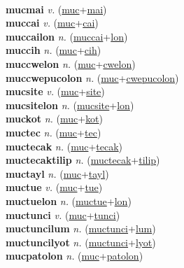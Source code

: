  \label{muclonolon} \\
\textbf{mucmai} \textit{v.} (\hyperref[muc]{muc}+\hyperref[mai]{mai})
 \label{mucmai} \\
\textbf{muccai} \textit{v.} (\hyperref[muc]{muc}+\hyperref[cai]{cai})
 \label{muccai} \\
\textbf{muccailon} \textit{n.} (\hyperref[muccai]{muccai}+\hyperref[lon]{lon})
 \label{muccailon} \\
\textbf{muccih} \textit{n.} (\hyperref[muc]{muc}+\hyperref[cih]{cih})
 \label{muccih} \\
\textbf{muccwelon} \textit{n.} (\hyperref[muc]{muc}+\hyperref[cwelon]{cwelon})
 \label{muccwelon} \\
\textbf{muccwepucolon} \textit{n.} (\hyperref[muc]{muc}+\hyperref[cwepucolon]{cwepucolon})
 \label{muccwepucolon} \\
\textbf{mucsite} \textit{v.} (\hyperref[muc]{muc}+\hyperref[site]{site})
 \label{mucsite} \\
\textbf{mucsitelon} \textit{n.} (\hyperref[mucsite]{mucsite}+\hyperref[lon]{lon})
 \label{mucsitelon} \\
\textbf{muckot} \textit{n.} (\hyperref[muc]{muc}+\hyperref[kot]{kot})
 \label{muckot} \\
\textbf{muctec} \textit{n.} (\hyperref[muc]{muc}+\hyperref[tec]{tec})
 \label{muctec} \\
\textbf{muctecak} \textit{n.} (\hyperref[muc]{muc}+\hyperref[tecak]{tecak})
 \label{muctecak} \\
\textbf{muctecaktilip} \textit{n.} (\hyperref[muctecak]{muctecak}+\hyperref[tilip]{tilip})
 \label{muctecaktilip} \\
\textbf{muctayl} \textit{n.} (\hyperref[muc]{muc}+\hyperref[tayl]{tayl})
 \label{muctayl} \\
\textbf{muctue} \textit{v.} (\hyperref[muc]{muc}+\hyperref[tue]{tue})
 \label{muctue} \\
\textbf{muctuelon} \textit{n.} (\hyperref[muctue]{muctue}+\hyperref[lon]{lon})
 \label{muctuelon} \\
\textbf{muctunci} \textit{v.} (\hyperref[muc]{muc}+\hyperref[tunci]{tunci})
 \label{muctunci} \\
\textbf{muctuncilum} \textit{n.} (\hyperref[muctunci]{muctunci}+\hyperref[lum]{lum})
 \label{muctuncilum} \\
\textbf{muctuncilyot} \textit{n.} (\hyperref[muctunci]{muctunci}+\hyperref[lyot]{lyot})
 \label{muctuncilyot} \\
\textbf{mucpatolon} \textit{n.} (\hyperref[muc]{muc}+\hyperref[patolon]{patolon})
